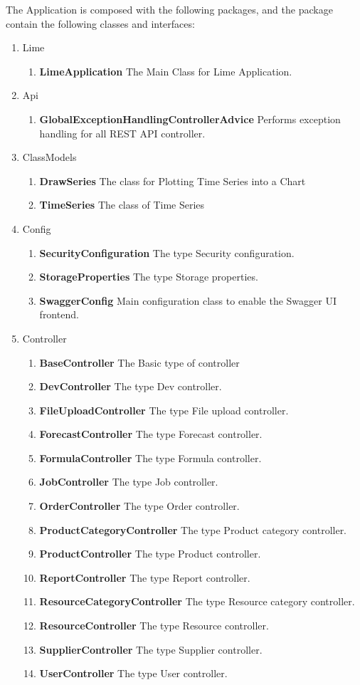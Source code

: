 \documentclass[a4paper,11pt,twoside]{report}
\theoremstyle{definition}
\begin{document}
The Application is composed with the following packages, and the package contain the following classes and interfaces:

\begin{enumerate} 
\item Lime	 
\begin{enumerate} 
\item \textbf{LimeApplication}	The Main Class for Lime Application.
\end{enumerate} 
\item Api	 
\begin{enumerate} 
\item \textbf{GlobalExceptionHandlingControllerAdvice} Performs exception handling for all REST API controller.
\end{enumerate} 
\item ClassModels	 
\begin{enumerate} 
\item \textbf{DrawSeries} The class for Plotting Time Series into a Chart
\item \textbf{TimeSeries} The class of Time Series
\end{enumerate} 
\item Config	 
\begin{enumerate} 
\item \textbf{SecurityConfiguration} The type Security configuration.
\item \textbf{StorageProperties} The type Storage properties.
\item \textbf{SwaggerConfig} Main configuration class to enable the Swagger UI frontend.
\end{enumerate} 
\item Controller	 
\begin{enumerate} 
\item \textbf{BaseController} The Basic type of controller
\item \textbf{DevController} The type Dev controller.
\item \textbf{FileUploadController} The type File upload controller.
\item \textbf{ForecastController} The type Forecast controller.
\item \textbf{FormulaController} The type Formula controller.
\item \textbf{JobController} The type Job controller.
\item \textbf{OrderController} The type Order controller.
\item \textbf{ProductCategoryController} The type Product category controller.
\item \textbf{ProductController} The type Product controller.
\item \textbf{ReportController} The type Report controller.
\item \textbf{ResourceCategoryController} The type Resource category controller.
\item \textbf{ResourceController} The type Resource controller.
\item \textbf{SupplierController} The type Supplier controller.
\item \textbf{UserController} The type User controller.


\end{enumerate}
\end{enumerate}
\end{document}
